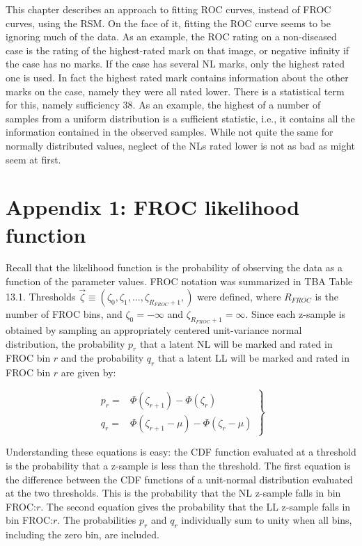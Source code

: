 \documentclass[
]{book}
\begin{document}
This chapter describes an approach to fitting ROC curves, instead of FROC curves, using the RSM. On the face of it, fitting the ROC curve seems to be ignoring much of the data. As an example, the ROC rating on a non-diseased case is the rating of the highest-rated mark on that image, or negative infinity if the case has no marks. If the case has several NL marks, only the highest rated one is used. In fact the highest rated mark contains information about the other marks on the case, namely they were all rated lower. There is a statistical term for this, namely sufficiency 38. As an example, the highest of a number of samples from a uniform distribution is a sufficient statistic, i.e., it contains all the information contained in the observed samples. While not quite the same for normally distributed values, neglect of the NLs rated lower is not as bad as might seem at first.

\hypertarget{rsm-fitting-froc-likelihood}{%
\section{Appendix 1: FROC likelihood function}\label{rsm-fitting-froc-likelihood}}

Recall that the likelihood function is the probability of observing the data as a function of the parameter values. FROC notation was summarized in TBA Table 13.1. Thresholds \(\overrightarrow{\zeta } \equiv \left ( \zeta_0, \zeta_1, ..., \zeta_{R_{FROC}+1}, \right )\) were defined, where \(R_{FROC}\) is the number of FROC bins, and \(\zeta_0 = -\infty\) and \(\zeta_{R_{FROC}+1} = \infty\). Since each z-sample is obtained by sampling an appropriately centered unit-variance normal distribution, the probability \(p_r\) that a latent NL will be marked and rated in FROC bin \(r\) and the probability \(q_r\) that a latent LL will be marked and rated in FROC bin \(r\) are given by:

\begin{equation}
\left. 
\begin{aligned}
p_r = & \Phi\left ( \zeta_{r+1} \right ) - \Phi\left ( \zeta_r \right ) \\
q_r = & \Phi\left ( \zeta_{r+1} - \mu \right ) - \Phi\left ( \zeta_r  - \mu \right ) 
\end{aligned}
\right \}
\label{eq:rsm-fitting-pr-qr}
\end{equation}

Understanding these equations is easy: the CDF function evaluated at a threshold is the probability that a z-sample is less than the threshold. The first equation is the difference between the CDF functions of a unit-normal distribution evaluated at the two thresholds. This is the probability that the NL z-sample falls in bin FROC:\(r\). The second equation gives the probability that the LL z-sample falls in bin FROC:\(r\). The probabilities \(p_r\) and \(q_r\) individually sum to unity when all bins, including the zero bin, are included.
\end{document}
